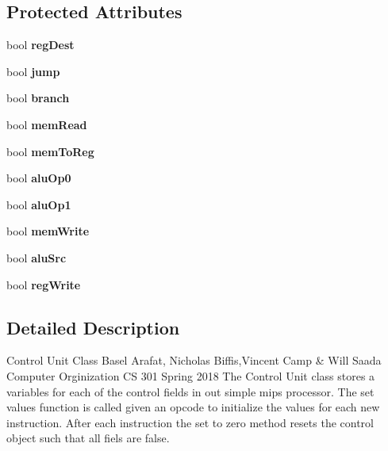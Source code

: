 \subsection*{Protected Attributes}
\begin{DoxyCompactItemize}
\item 
\mbox{\label{class_control_unit_a1a358866ea9b1cdf2eb9991aa53dcac4}} 
bool {\bfseries reg\+Dest}
\item 
\mbox{\label{class_control_unit_a6c1a54a1add2956c4b7a8530fff15694}} 
bool {\bfseries jump}
\item 
\mbox{\label{class_control_unit_a762297f2d108f6460568d70cda61a48a}} 
bool {\bfseries branch}
\item 
\mbox{\label{class_control_unit_a7ed126ebae561f9be40115eb8af2ea96}} 
bool {\bfseries mem\+Read}
\item 
\mbox{\label{class_control_unit_aa6af09909a643347c22da2cb4ecbb296}} 
bool {\bfseries mem\+To\+Reg}
\item 
\mbox{\label{class_control_unit_a315e08378f8dd09eb6a79591f786e868}} 
bool {\bfseries alu\+Op0}
\item 
\mbox{\label{class_control_unit_a9cba72addede51df99643d7ced8cf4f5}} 
bool {\bfseries alu\+Op1}
\item 
\mbox{\label{class_control_unit_aa0fb2a86fa2aec280a54fb5b16764228}} 
bool {\bfseries mem\+Write}
\item 
\mbox{\label{class_control_unit_a83ad7dabedcb59e95819eb586504c65a}} 
bool {\bfseries alu\+Src}
\item 
\mbox{\label{class_control_unit_afabd2fdec59ff539540aca5549203d89}} 
bool {\bfseries reg\+Write}
\end{DoxyCompactItemize}


\subsection{Detailed Description}
Control Unit Class Basel Arafat, Nicholas Biffis,Vincent Camp \& Will Saada Computer Orginization CS 301 Spring 2018 The Control Unit class stores a variables for each of the control fields in out simple mips processor. The set values function is called given an opcode to initialize the values for each new instruction. After each instruction the set to zero method resets the control object such that all fiels are false. 

